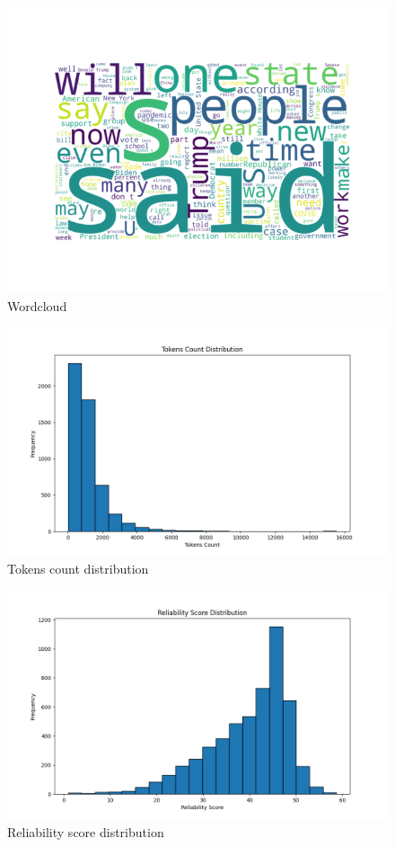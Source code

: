 \begin{figure}[ht]
    \centering
    \includegraphics[width=0.9\linewidth]{figures/wordcloud_vx.png}
    \caption{Wordcloud}
    \label{fig:wordcloud}
\end{figure}


\begin{figure}[ht]
    \centering
    \includegraphics[width=0.9\linewidth]{figures/tokens_count_vx_hist.png}
    \caption{Tokens count distribution}
    \label{fig:tokens_hist}
\end{figure}


\begin{figure}[ht]
    \centering
    \includegraphics[width=0.9\linewidth]{figures/reliability_score_hist.png}
    \caption{Reliability score distribution}
    \label{fig:reliability_score_hist}
\end{figure}

